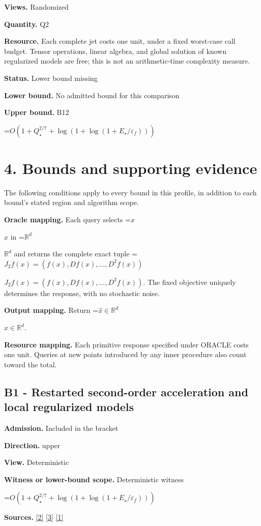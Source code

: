\documentclass[10pt,a4paper]{article}
\newcommand{\AtlasMath}[1]{\par\begingroup\centering\setbox0=\hbox{$\displaystyle #1$}\ifdim\wd0>1.4\linewidth\typeout{ATLAS WIDE FORMULA: \the\wd0}\fi\ifdim\wd0>\linewidth\resizebox{\linewidth}{!}{\box0}\else\box0\fi\par\endgroup}
\newcommand{\AtlasInlineMath}[1]{\begingroup\setbox0=\hbox{$#1$}\ifdim\wd0>.4\linewidth\endgroup\AtlasMath{#1}\else\endgroup$#1$\fi}
\begin{document}
\textbf{Views.} Randomized

\textbf{Quantity.} Q2

\textbf{Resource.} Each complete jet costs one unit, under a fixed worst-case call budget. Tensor operations, linear algebra, and global solution of known regularized models are free; this is not an arithmetic-time complexity measure.

\textbf{Status.} Lower bound missing

\textbf{Lower bound.} No admitted bound for this comparison

\textbf{Upper bound.} B12

\AtlasMath{O(1+Q_\star^{2/7}+\log(1+\log(1+E_\star/\varepsilon_f)))}
\section{4. Bounds and supporting evidence}
The following conditions apply to every bound in this profile, in addition to each bound's stated region and algorithm scope.

\textbf{Oracle mapping.} Each query selects \AtlasInlineMath{x} in \AtlasInlineMath{\mathbb{R}^d} and returns the complete exact tuple \AtlasInlineMath{J_{2}f(x)=(f(x),Df(x),\ldots,D^{2}f(x))}. The fixed objective uniquely determines the response, with no stochastic noise.

\textbf{Output mapping.} Return \AtlasInlineMath{\widehat{x}\in \mathbb{R}^d}.

\textbf{Resource mapping.} Each primitive response specified under ORACLE costs one unit. Queries at new points introduced by any inner procedure also count toward the total.

\subsection{B1 - Restarted second-order acceleration and local regularized models}
\textbf{Admission.} Included in the bracket

\textbf{Direction.} upper

\textbf{View.} Deterministic

\textbf{Witness or lower-bound scope.} Deterministic witness

\AtlasMath{O(1+Q_\star^{2/7}+\log(1+\log(1+E_\star/\varepsilon_f)))}
\textbf{Sources.} \href{https://arxiv.org/pdf/2205.09647v1}{[2]} \href{https://arxiv.org/pdf/2010.06642v2}{[3]} \href{https://arxiv.org/pdf/1705.07260v2}{[1]}
\end{document}
